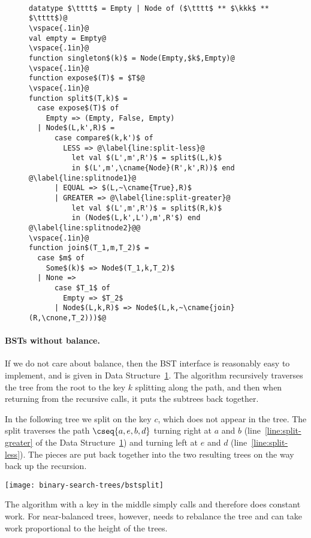 \begin{figure}
\begin{datastructure}~
\label{ds:bstjoin}
\begin{lstlisting}
datatype $\tttt$ = Empty | Node of ($\tttt$ ** $\kkk$ ** $\tttt$)@
\vspace{.1in}@
val empty = Empty@
\vspace{.1in}@
function singleton$(k)$ = Node(Empty,$k$,Empty)@
\vspace{.1in}@
function expose$(T)$ = $T$@
\vspace{.1in}@
function split$(T,k)$ =
  case expose$(T)$ of
    Empty => (Empty, False, Empty)
  | Node$(L,k',R)$ =
      case compare$(k,k')$ of
        LESS => @\label{line:split-less}@
          let val $(L',m',R')$ = split$(L,k)$
          in $(L',m',\cname{Node}(R',k',R))$ end @\label{line:splitnode1}@
      | EQUAL => $(L,~\cname{True},R)$
      | GREATER => @\label{line:split-greater}@
          let val $(L',m',R')$ = split$(R,k)$
          in (Node$(L,k',L'),m',R'$) end @\label{line:splitnode2}@@
\vspace{.1in}@
function join$(T_1,m,T_2)$ =
  case $m$ of
    Some$(k)$ => Node$(T_1,k,T_2)$
  | None =>
      case $T_1$ of
        Empty => $T_2$
      | Node$(L,k,R)$ => Node$(L,k,~\cname{join}(R,\cnone,T_2)))$@
\end{lstlisting}
\end{datastructure}
\end{figure}

\paragraph{BSTs without balance.}
If we do not care about balance, then the BST interface is reasonably easy
to implement, and is given in Data Structure~\ref{ds:bstjoin}.    
The  algorithm recursively traverses the tree from the
root to the key $k$ splitting along the path, and then when returning from
the recursive calls, it puts the subtrees back together.
\begin{example}
In the following tree we split on the key $c$, which does not appear
in the tree.  The split traverses
the path $\cseq{a,e,b,d}$ turning right at $a$ and $b$
(line~\ref{line:split-greater} of the Data Structure~\ref{ds:bstjoin})
and turning left at $e$ and $d$ (line~\ref{line:split-less}).  The
pieces are put back together into the two resulting trees on the way
back up the recursion.  
\begin{center}
  \texttt{[image: binary-search-trees/bstsplit]}
\end{center}
\end{example}
The  algorithm with a key in the middle simply calls
 and therefore does constant work.  For near-balanced
trees, however,  needs to rebalance the tree and can take
work proportional to the height of the trees.

